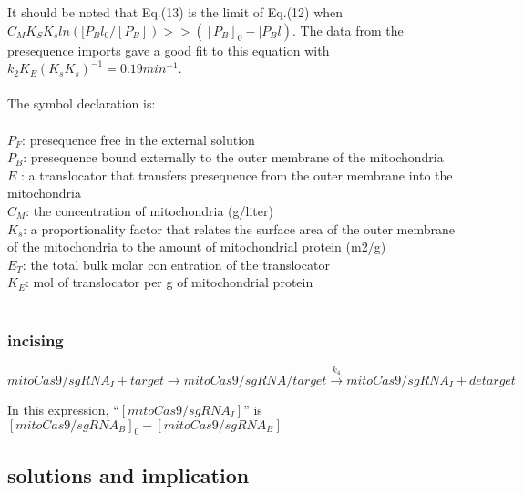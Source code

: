 It should be noted that Eq.(13) is the limit of Eq.(12) when $C_MK_S K_sln([P_Bl_0/[P_B]) >> ([P_B]_0 - [P_Bl)$. The data from the presequence imports gave a good fit to this equation with $k_2K_E(K_s K_s)^{-1} = 0.19 min^{-1}$.
	\\\\
	The symbol declaration is:\\\\
	$P_F$: presequence free in the external  solution\\
	$P_B$: presequence bound externally to the outer membrane of the mitochondria\\
	$E$ : a translocator that transfers presequence from the outer membrane into the mitochondria\\
	$C_M$: the concentration of mitochondria (g/liter)\\
	$K_s$: a proportionality factor that relates the surface area of the outer membrane of the mitochondria to the amount of mitochondrial protein (m2/g) \\
	$E_T$: the total bulk molar con entration of the translocator\\
	$K_E$: mol of translocator per g of mitochondrial protein
	\\\\ 
	
\subsubsection{incising}

\begin{displaymath}
mitoCas9/sgRNA_I+target\longrightarrow mitoCas9/sgRNA/target\stackrel{k_4} {\longrightarrow} mitoCas9/sgRNA_I+detarget
\end{displaymath}

In this expression, “$[mitoCas9/sgRNA_I]$” is $ [mitoCas9/sgRNA_B]_0-[mitoCas9/sgRNA_B]$ 

\subsection{solutions and implication}


